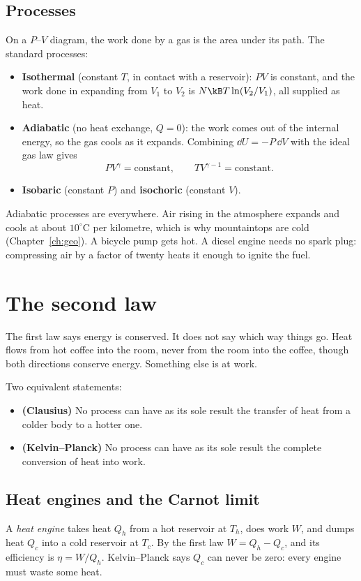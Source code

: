 \subsection{Processes}
On a $P$--$V$ diagram, the work done by a gas is the area under its path. The standard processes:
\begin{itemize}[itemsep=3pt]
  \item \textbf{Isothermal} (constant $T$, in contact with a reservoir): $PV$ is constant, and the work done in expanding from $V_1$ to $V_2$ is $N\kB T\ln(V_2/V_1)$, all supplied as heat.
  \item \textbf{Adiabatic} (no heat exchange, $Q=0$): the work comes out of the internal energy, so the gas cools as it expands. Combining $\dd U = -P\,\dd V$ with the ideal gas law gives
  \[
    PV^{\gamma} = \text{constant}, \qquad TV^{\gamma-1} = \text{constant}.
  \]
  \item \textbf{Isobaric} (constant $P$) and \textbf{isochoric} (constant $V$).
\end{itemize}
Adiabatic processes are everywhere. Air rising in the atmosphere expands and cools at about $10^\circ\text{C}$ per kilometre, which is why mountaintops are cold (Chapter~\ref{ch:geo}). A bicycle pump gets hot. A diesel engine needs no spark plug: compressing air by a factor of twenty heats it enough to ignite the fuel.

\section{The second law}

The first law says energy is conserved. It does not say which way things go. Heat flows from hot coffee into the room, never from the room into the coffee, though both directions conserve energy. Something else is at work.

\begin{law}
Two equivalent statements:
\begin{itemize}[itemsep=2pt]
  \item \textbf{(Clausius)} No process can have as its sole result the transfer of heat from a colder body to a hotter one.
  \item \textbf{(Kelvin--Planck)} No process can have as its sole result the complete conversion of heat into work.
\end{itemize}
\end{law}

\subsection{Heat engines and the Carnot limit}
A \emph{heat engine} takes heat $Q_h$ from a hot reservoir at $T_h$, does work $W$, and dumps heat $Q_c$ into a cold reservoir at $T_c$. By the first law $W = Q_h - Q_c$, and its efficiency is $\eta = W/Q_h$. Kelvin--Planck says $Q_c$ can never be zero: every engine must waste some heat.

